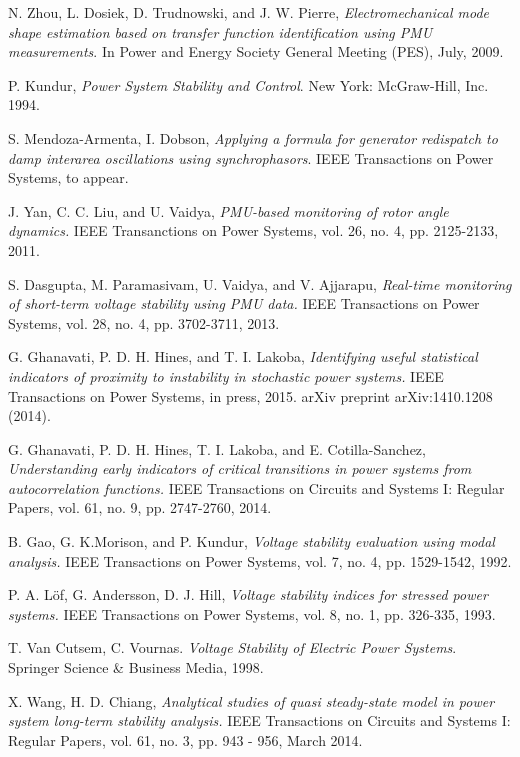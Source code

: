 \documentclass[journal]{IEEEtran}
\begin{document}
\begin{thebibliography}{1}
N. Zhou, L. Dosiek, D. Trudnowski, and J. W. Pierre, {\em Electromechanical mode shape estimation based on transfer function identification
using PMU measurements}.
\newblock In Power and Energy Society General Meeting (PES), July, 2009.

P. Kundur, {\em Power System Stability and Control}.
\newblock New York: McGraw-Hill, Inc. 1994.

S. Mendoza-Armenta, I. Dobson, {\em Applying a formula for generator redispatch to damp interarea oscillations using synchrophasors}.
\newblock IEEE Transactions on Power Systems, to appear.

J. Yan, C. C. Liu, and U. Vaidya, {\em PMU-based monitoring of rotor angle dynamics.}
\newblock IEEE Transanctions on Power Systems, vol. 26, no. 4, pp. 2125-2133, 2011.

S. Dasgupta, M. Paramasivam, U. Vaidya, and V. Ajjarapu, {\em Real-time monitoring of short-term voltage stability using PMU data.}
\newblock IEEE Transactions on Power Systems, vol. 28, no. 4, pp. 3702-3711, 2013.

G. Ghanavati, P. D. H. Hines, and T. I. Lakoba, {\em Identifying useful statistical indicators of proximity to instability in stochastic power systems.}
\newblock IEEE Transactions on Power Systems, in press, 2015. arXiv preprint arXiv:1410.1208 (2014).

G. Ghanavati, P. D. H. Hines, T. I. Lakoba, and E. Cotilla-Sanchez, {\em Understanding early indicators of critical transitions in power systems from autocorrelation functions.}
\newblock IEEE Transactions on Circuits and Systems I: Regular Papers, vol. 61, no. 9, pp. 2747-2760, 2014.

B. Gao, G. K.Morison, and P. Kundur, {\em Voltage stability evaluation using modal analysis.}
\newblock IEEE Transactions on Power Systems, vol. 7, no. 4, pp. 1529-1542, 1992.

P. A. L\"{o}f, G. Andersson, D. J. Hill, {\em Voltage stability indices for stressed power systems.}
\newblock IEEE Transactions on Power Systems, vol. 8, no. 1, pp. 326-335, 1993.

T. Van Cutsem, C. Vournas. {\em Voltage Stability of Electric Power Systems}.
\newblock Springer Science \& Business Media, 1998.

X. Wang, H. D. Chiang, {\em Analytical studies of quasi steady-state model in power system long-term stability analysis.}
\newblock IEEE Transactions on Circuits and Systems I: Regular Papers, vol. 61, no. 3, pp. 943 - 956, March 2014.


\end{thebibliography}
\end{document}
